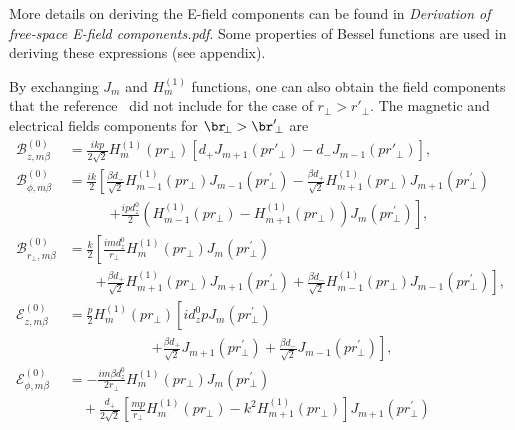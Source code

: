 \documentclass[]{report}
\begin{document}
More details on deriving the E-field components can be found in \textit{Derivation of free-space E-field components.pdf}. Some properties of Bessel functions are used in deriving these expressions (see appendix). 

By exchanging $J_m$ and $H_m^{(1)}$ functions, one can also obtain the field components that the reference~\cite{Klimov2004} did not include for the case of $ r\!_\perp>r'\!_\perp $. The magnetic and electrical fields components for $ \br\!_\perp>\br'\!_\perp $ are 
\begin{align}
\mathcal{B}_{z,m\beta}^{(0)} &= \frac{ikp}{2\sqrt{2}}H^{(1)}_m(pr\!_\perp)\left[ d_{+} J_{m+1}(pr'\!\!_\perp) \!-\! d_- J_{m-1}(pr'\!_\perp) \right],\\
\mathcal{B}_{\phi,m\beta}^{(0)} &= \frac{ik}{2}\left[ \frac{\beta d_{-}}{\sqrt{2}} H^{(1)}_{m-1}\left( pr\!_\perp \right)J_{m-1}\left( {pr\!_\perp^{\prime} }\right) -\frac{\beta d_+}{\sqrt{2}} H^{(1)}_{m+1}\left( pr\!_\perp \right)J_{m+1}\left( {pr\!_\perp^{\prime} }\right)\right. \nonumber\\ 
&\qquad\quad \left. + \frac{ipd^0_z}{2}\left(H^{(1)}_{m-1}(pr\!_\perp)-H^{(1)}_{m+1}(pr\!_\perp) \right)J_m(pr\!_\perp^{\prime}) \right],\\
\mathcal{B}_{r\!_\perp, m\beta}^{(0)} &= \frac{k}{2}\left[\frac{i m d^0_z}{r\!_\perp} H^{(1)}_m\left( pr\!_\perp \right) J_m\left( {pr\!_\perp^{\prime} }\right) \right. \nonumber\\
&\qquad \left. +\frac{\beta d_+}{\sqrt{2}} H^{(1)}_{m\!+\!1}(pr\!_\perp) J_{m\!+\! 1}(pr\!_\perp^{\prime}) \!+\! \frac{\beta d_-}{\sqrt{2}} H^{(1)}_{m\!-\! 1}(pr\!_\perp) J_{m\!-\!1}(pr\!_\perp^{\prime})   \right],\\
\mathcal{E}_{z,m\beta}^{(0)} 
&= \frac{p}{2}H^{(1)}_{m}\left( pr\!_\perp \right)\left[  id^0_z p J_m\left( {pr\!_\perp^{\prime} }\right) \phantom{\frac{d^0_z}{\sqrt{2}}} \right. \nonumber\\
&\qquad\qquad\qquad \left. + \frac{\beta d_{+}}{\sqrt{2}} J_{m+1}\left( {pr\!_\perp^{\prime} }\right) +\frac{\beta d_-}{\sqrt{2}} J_{m-1}\left( {pr\!_\perp^{\prime} }\right) \right], \\
\mathcal{E}_{\phi,m\beta}^{(0)} 
&= -\frac{im\beta d^0_z}{2r\!_\perp} H^{(1)}_{m}\left( pr\!_\perp \right) J_m\left( {pr\!_\perp^{\prime} }\right) \nonumber\\
&\quad+\frac{d_+}{2\sqrt{2}} \left[ \frac{mp}{r\!_\perp}H^{(1)}_{m}\left( pr\!_\perp \right)-k^2 H^{(1)}_{m+1}\left( pr\!_\perp \right)\right] J_{m+1}\left( {pr\!_\perp^{\prime} }\right) \nonumber\\

\end{align}
\end{document}

